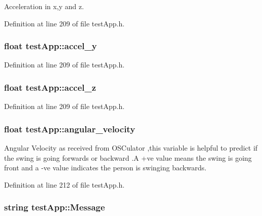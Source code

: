 Acceleration in x,y and z. 



Definition at line 209 of file test\-App.\-h.

\hypertarget{group___wii_mote_ga204bcb2412a70a65ebea6008ee8c4eb0}{
\subsubsection[{accel\-\_\-y}]{\setlength{\rightskip}{0pt plus 5cm}float test\-App\-::accel\-\_\-y}}\label{group___wii_mote_ga204bcb2412a70a65ebea6008ee8c4eb0}


Definition at line 209 of file test\-App.\-h.

\hypertarget{group___wii_mote_ga61dbdd5c0b868568dde40a52f6e56054}{
\subsubsection[{accel\-\_\-z}]{\setlength{\rightskip}{0pt plus 5cm}float test\-App\-::accel\-\_\-z}}\label{group___wii_mote_ga61dbdd5c0b868568dde40a52f6e56054}


Definition at line 209 of file test\-App.\-h.

\hypertarget{group___wii_mote_ga98e05c3206ff95fccfebfc9df5317598}{
\subsubsection[{angular\-\_\-velocity}]{\setlength{\rightskip}{0pt plus 5cm}float test\-App\-::angular\-\_\-velocity}}\label{group___wii_mote_ga98e05c3206ff95fccfebfc9df5317598}


Angular Velocity as received from O\-S\-Culator ,this variable is helpful to predict if the swing is going forwards or backward .A +ve value means the swing is going front and a -\/ve value indicates the person is swinging backwards. 



Definition at line 212 of file test\-App.\-h.

\hypertarget{group___wii_mote_ga0124035d0454fb6bd9152f8a87c40677}{
\subsubsection[{Message}]{\setlength{\rightskip}{0pt plus 5cm}string test\-App\-::\-Message}}\label{group___wii_mote_ga0124035d0454fb6bd9152f8a87c40677}


